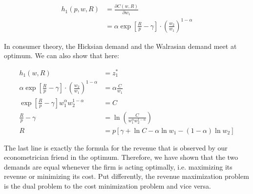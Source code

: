 {\begin{enumerate}[label=(\alph*)]
{\begin{align*}
    h_1(p,w,R)&=\frac{\partial C\left(w,R\right)}{\partial w_1} \\
    &= \alpha \exp \left[\frac{R}{p}-\gamma\right] \cdot\left(\frac{w_2}{w_1}\right)^{1-\alpha}
\end{align*}
}
{\item 
In consumer theory, the Hicksian demand and the Walrasian demand meet at optimum. We can also show that here:

\begin{align*}
    h_1(w,R)&=z_1^* \\
    \alpha \exp \left[\frac{R}{p}-\gamma\right] \cdot\left(\frac{w_2}{w_1}\right)^{1-\alpha}&=\alpha \frac{C}{w_1}\\
    \exp \left[\frac{R}{p}-\gamma\right] w_1^\alpha w_2^{1-\alpha}&=C \\
    \frac{R}{p}-\gamma &= \ln \left(\frac{C}{w_1^\alpha w_2^{1-\alpha}} \right) \\
    R&=p\left[\gamma+\ln C-\alpha \ln w_1-(1-\alpha) \ln w_2\right]
\end{align*}

The last line is exactly the formula for the revenue that is observed by our econometrician friend in the optimum. Therefore, we have shown that the two demands are equal whenever the firm is acting optimally, i.e. maximizing its revenue or minimizing its cost. Put differently, the revenue maximization problem is the dual problem to the cost minimization problem and vice versa.
}
\end{enumerate}
}

